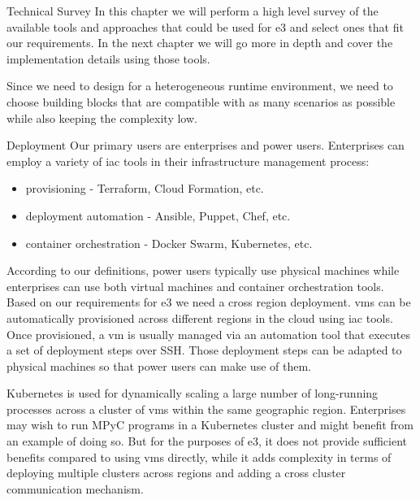 \begin{frame}{Technical Survey}
\protect\hypertarget{technical-survey}{}
In this chapter we will perform a high level survey of the available
tools and approaches that could be used for \gls{e3} and select ones
that fit our requirements. In the next chapter we will go more in depth
and cover the implementation details using those tools.

Since we need to design for a heterogeneous runtime environment, we need
to choose building blocks that are compatible with as many scenarios as
possible while also keeping the complexity low.

\begin{block}{Deployment}
\protect\hypertarget{deployment}{}
Our primary users are enterprises and power users. Enterprises can
employ a variety of \gls{iac} tools in their infrastructure management
process:

\begin{itemize}
\tightlist
\item
  provisioning - Terraform\autocite{tfDocs}, Cloud
  Formation\autocite{cfDocs}, etc.
\item
  deployment automation - Ansible\autocite{ansibleDocs},
  Puppet\autocite{puppetDocs}, Chef\autocite{chefDocs}, etc.
\item
  container orchestration - Docker Swarm\autocite{dockerDocs},
  Kubernetes\autocite{kubeDocs}, etc.
\end{itemize}

According to our definitions, power users typically use physical
machines while enterprises can use both virtual machines and container
orchestration tools. Based on our requirements for \gls{e3} we need a
cross region deployment. \glspl{vm} can be automatically provisioned
across different regions in the cloud using \gls{iac} tools. Once
provisioned, a \gls{vm} is usually managed via an automation tool that
executes a set of deployment steps over SSH. Those deployment steps can
be adapted to physical machines so that power users can make use of
them.

Kubernetes is used for dynamically scaling a large number of
long-running processes across a cluster of \glspl{vm} within the same
geographic region. Enterprises may wish to run MPyC programs in a
Kubernetes cluster and might benefit from an example of doing so. But
for the purposes of \gls{e3}, it does not provide sufficient benefits
compared to using \glspl{vm} directly, while it adds complexity in terms
of deploying multiple clusters across regions and adding a cross cluster
communication mechanism.


\end{block}
\end{frame}
